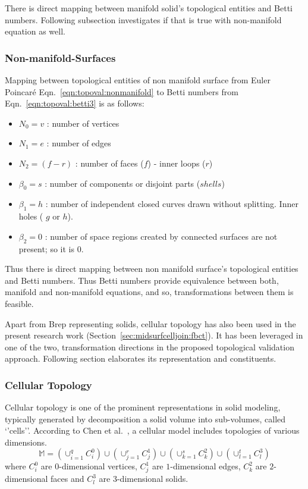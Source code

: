 There is direct mapping between manifold solid's topological entities and Betti numbers. Following subsection investigates if that is true with non-manifold equation as well.

\subsubsection{Non-manifold-Surfaces}


Mapping between topological entities of non manifold surface from Euler Poincar\'e Eqn.~\ref{eqn:topoval:nonmanifold} to Betti numbers from Eqn.~\ref{eqn:topoval:betti3} is as follows:

\begin{itemize}
[noitemsep,topsep=2pt,parsep=2pt,partopsep=2pt,label={}]
\item $N_{0} = v$ : number of vertices
\item $N_{1} = e$ : number of edges
\item $N_{2} = (f - r)$ : number of faces ($f$) -  inner loops ($r$)
\item $\beta_{0} = s$ : number of components or disjoint parts ($shells$)
\item $\beta_{1} = h$ : number of independent closed curves drawn without splitting. Inner holes ( $g$ or $h$). 
\item $\beta_{2} = 0$ : number of space regions created by connected surfaces are not present; so it is $0$.
\end{itemize}

Thus there is direct mapping between non manifold surface's topological entities and Betti numbers. Thus Betti numbers provide equivalence between both, manifold and non-manifold equations, and so, transformations between them is feasible.


Apart from Brep representing solids, cellular topology has also been used in the present research work (Section~\ref{sec:midsurfcelljoin:fbct}). It has been leveraged in one of the two, transformation directions in the proposed topological validation approach. Following section elaborates its representation and constituents.

\subsubsection{Cellular Topology}
Cellular topology is one of the prominent representations in solid modeling, typically generated by decomposition a solid volume into sub-volumes, called `'cells''. According to Chen et al.~\cite{Chen2006}, a cellular model includes topologies of various dimensions. 
$$\mathbb{M} = 
(\cup_{i=1}^{q} C_i^0 ) \cup 
(\cup_{j=1}^{r} C_j^1 ) \cup  
(\cup_{k=1}^{s} C_k^2 ) \cup 
(\cup_{l=1}^{t} C_l^3 ) $$ where  $C_i^0$ are $0$-dimensional vertices,  $C_j^1$ are $1$-dimensional edges,  $C_k^2$ are $2$-dimensional faces and  $C_l^3$ are $3$-dimensional solids.


